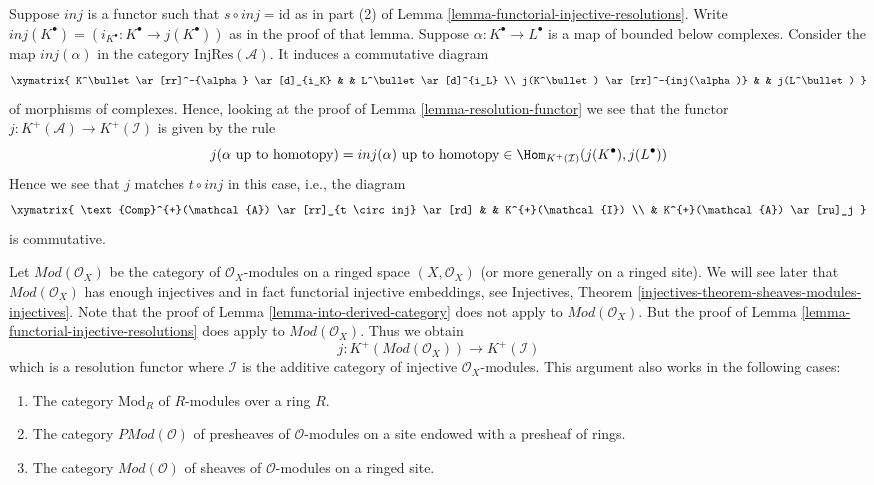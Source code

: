 \begin{remark}
\label{remark-match}
Suppose $inj$ is a functor such that $s \circ inj = \text{id}$
as in part (2) of
Lemma \ref{lemma-functorial-injective-resolutions}.
Write $inj(K^\bullet) = (i_{K^\bullet} : K^\bullet \to j(K^\bullet))$
as in the proof of that lemma.
Suppose $\alpha : K^\bullet \to L^\bullet$ is a map
of bounded below complexes. Consider the map
$inj(\alpha)$ in the category $\text{InjRes}(\mathcal{A})$.
It induces a commutative diagram
$$
\xymatrix{
K^\bullet
\ar[rr]^-{\alpha}
\ar[d]_{i_K} & &
L^\bullet \ar[d]^{i_L} \\
j(K^\bullet)
\ar[rr]^-{inj(\alpha)}
& &
j(L^\bullet)
}
$$
of morphisms of complexes.
Hence, looking at the proof of
Lemma \ref{lemma-resolution-functor}
we see that the functor $j : K^{+}(\mathcal{A}) \to K^{+}(\mathcal{I})$
is given by the rule
$$
j(\alpha\text{ up to homotopy}) = inj(\alpha)\text{ up to homotopy}\in
\Hom_{K^{+}(\mathcal{I})}(j(K^\bullet), j(L^\bullet))
$$
Hence we see that $j$ matches $t \circ inj$ in this case, i.e., the
diagram
$$
\xymatrix{
\text{Comp}^{+}(\mathcal{A}) \ar[rr]_{t \circ inj} \ar[rd] & &
K^{+}(\mathcal{I}) \\
& K^{+}(\mathcal{A}) \ar[ru]_j
}
$$
is commutative.
\end{remark}

\begin{remark}
\label{remark-big-abelian-category}
Let $\textit{Mod}(\mathcal{O}_X)$ be the category of $\mathcal{O}_X$-modules
on a ringed space $(X, \mathcal{O}_X)$ (or more generally on a
ringed site). We will see later that $\textit{Mod}(\mathcal{O}_X)$ has enough
injectives and in fact functorial injective embeddings, see
Injectives, Theorem \ref{injectives-theorem-sheaves-modules-injectives}.
Note that the proof of Lemma \ref{lemma-into-derived-category} does
not apply to $\textit{Mod}(\mathcal{O}_X)$. But the proof of
Lemma \ref{lemma-functorial-injective-resolutions} does apply
to $\textit{Mod}(\mathcal{O}_X)$. Thus we obtain
$$
j : K^{+}(\textit{Mod}(\mathcal{O}_X))
\longrightarrow
K^{+}(\mathcal{I})
$$
which is a resolution functor where $\mathcal{I}$ is the additive
category of injective $\mathcal{O}_X$-modules. This argument also
works in the following cases:
\begin{enumerate}
\item The category $\text{Mod}_R$ of $R$-modules over a ring $R$.
\item The category $\textit{PMod}(\mathcal{O})$ of presheaves of
$\mathcal{O}$-modules on a site endowed with a presheaf of rings.
\item The category $\textit{Mod}(\mathcal{O})$ of sheaves of
$\mathcal{O}$-modules on a ringed site.

\end{enumerate}
\end{remark}









